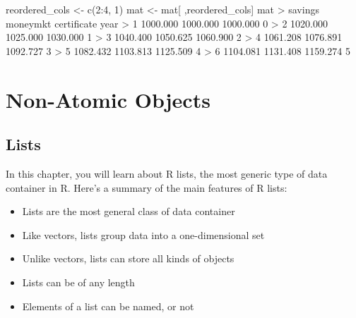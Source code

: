 \documentclass[
]{book}
\newenvironment{Shaded}{\begin{snugshade}}{\end{snugshade}}
\newcommand{\DecValTok}[1]{\textcolor[rgb]{0.00,0.00,0.81}{#1}}
\newcommand{\FloatTok}[1]{\textcolor[rgb]{0.00,0.00,0.81}{#1}}
\newcommand{\FunctionTok}[1]{\textcolor[rgb]{0.00,0.00,0.00}{#1}}
\newcommand{\NormalTok}[1]{#1}
\newcommand{\OtherTok}[1]{\textcolor[rgb]{0.56,0.35,0.01}{#1}}
\newcommand{\SpecialCharTok}[1]{\textcolor[rgb]{0.00,0.00,0.00}{#1}}
\providecommand{\tightlist}{%
  \setlength{\itemsep}{0pt}\setlength{\parskip}{0pt}}
\begin{document}
\begin{Shaded}
\begin{Highlighting}[]
\NormalTok{reordered\_cols }\OtherTok{\textless{}{-}} \FunctionTok{c}\NormalTok{(}\DecValTok{2}\SpecialCharTok{:}\DecValTok{4}\NormalTok{, }\DecValTok{1}\NormalTok{)}
\NormalTok{mat }\OtherTok{\textless{}{-}}\NormalTok{ mat[ ,reordered\_cols]}
\NormalTok{mat}
\SpecialCharTok{\textgreater{}}\NormalTok{    savings moneymkt certificate year}
\SpecialCharTok{\textgreater{}} \DecValTok{1} \FloatTok{1000.000} \FloatTok{1000.000}    \FloatTok{1000.000}    \DecValTok{0}
\SpecialCharTok{\textgreater{}} \DecValTok{2} \FloatTok{1020.000} \FloatTok{1025.000}    \FloatTok{1030.000}    \DecValTok{1}
\SpecialCharTok{\textgreater{}} \DecValTok{3} \FloatTok{1040.400} \FloatTok{1050.625}    \FloatTok{1060.900}    \DecValTok{2}
\SpecialCharTok{\textgreater{}} \DecValTok{4} \FloatTok{1061.208} \FloatTok{1076.891}    \FloatTok{1092.727}    \DecValTok{3}
\SpecialCharTok{\textgreater{}} \DecValTok{5} \FloatTok{1082.432} \FloatTok{1103.813}    \FloatTok{1125.509}    \DecValTok{4}
\SpecialCharTok{\textgreater{}} \DecValTok{6} \FloatTok{1104.081} \FloatTok{1131.408}    \FloatTok{1159.274}    \DecValTok{5}
\end{Highlighting}
\end{Shaded}

\hypertarget{part-non-atomic-objects}{%
\part{Non-Atomic Objects}\label{part-non-atomic-objects}}

\hypertarget{lists}{%
\chapter{Lists}\label{lists}}

In this chapter, you will learn about R lists, the most generic type of data
container in R. Here's a summary of the main features of R lists:

\begin{itemize}
\tightlist
\item
  Lists are the most general class of data container
\item
  Like vectors, lists group data into a one-dimensional set
\item
  Unlike vectors, lists can store all kinds of objects
\item
  Lists can be of any length
\item
  Elements of a list can be named, or not
\end{itemize}
\end{document}
